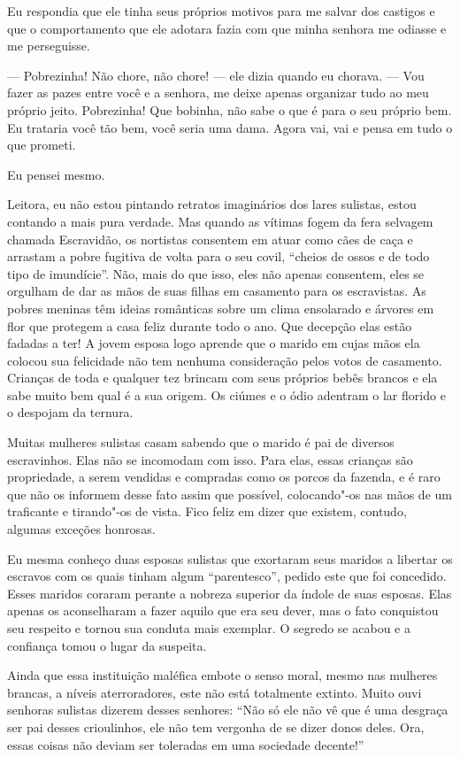 Eu respondia que ele tinha seus próprios motivos para me salvar dos
castigos e que o comportamento que ele adotara fazia com que minha
senhora me odiasse e me perseguisse.

--- Pobrezinha! Não chore, não chore! --- ele dizia quando eu chorava.
--- Vou fazer as pazes entre você e a senhora, me deixe apenas organizar
tudo ao meu próprio jeito. Pobrezinha! Que bobinha, não sabe o que é
para o seu próprio bem. Eu trataria você tão bem, você seria uma dama.
Agora vai, vai e pensa em tudo o que prometi.

Eu pensei mesmo.

Leitora, eu não estou pintando retratos
imaginários dos lares sulistas, estou contando a mais pura verdade.
Mas quando as vítimas fogem da
fera selvagem chamada Escravidão, os nortistas consentem em atuar como
cães de caça e arrastam a pobre fugitiva de volta para o seu covil,
``cheios de ossos e de todo tipo de imundície''. Não, mais do que isso,
eles não apenas consentem, eles se orgulham de dar as mãos de suas
filhas em casamento para os escravistas. As pobres meninas têm ideias
românticas sobre um clima ensolarado e árvores em flor que protegem a
casa feliz durante todo o ano. Que decepção elas estão fadadas a ter! A
jovem esposa logo aprende que o marido em cujas mãos ela colocou sua
felicidade não tem nenhuma consideração pelos votos de casamento.
Crianças de toda e qualquer tez brincam com seus próprios bebês brancos
e ela sabe muito bem qual é a sua origem. Os ciúmes e o ódio adentram o
lar florido e o despojam da ternura.

Muitas mulheres sulistas casam sabendo
que o marido é pai de diversos escravinhos. Elas não se incomodam com
isso. Para elas, essas crianças são propriedade, a serem vendidas e
compradas como os porcos da fazenda, e é raro que não os informem desse
fato assim que possível, colocando"-os nas mãos de um traficante e
tirando"-os de vista. Fico feliz em dizer que existem, contudo, algumas
exceções honrosas.

Eu mesma conheço duas esposas sulistas
que exortaram seus maridos a libertar os escravos com os quais tinham
algum ``parentesco'', pedido este que foi concedido. Esses maridos
coraram perante a nobreza superior da índole de suas esposas. Elas
apenas os aconselharam a fazer aquilo que era seu dever, mas o fato
conquistou seu respeito e tornou sua conduta mais exemplar. O segredo se
acabou e a confiança tomou o lugar da suspeita.

Ainda que essa instituição maléfica
embote o senso moral, mesmo nas mulheres brancas, a níveis
aterroradores, este não está totalmente extinto. Muito ouvi senhoras
sulistas dizerem desses senhores: ``Não só ele não vê que é uma desgraça
ser pai desses crioulinhos, ele não tem vergonha de se dizer donos
deles. Ora, essas coisas não deviam ser toleradas em uma sociedade
decente!''

